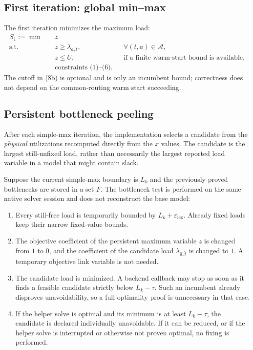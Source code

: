 \documentclass[11pt,a4paper]{article}
\newcommand{\Acal}{\mathcal{A}}
\begin{document}
\subsection{First iteration: global min--max}

The first iteration minimizes the maximum load:
\begin{align}
S_1:=\min\quad &z \\
\text{s.t.}\quad
&z\geq\lambda_{a,t}, &&\forall(t,a)\in\Acal, \tag{8a}\\
&z\leq U, &&\text{if a finite warm-start bound is available}, \tag{8b}\\
&\text{constraints (1)--(6).} \nonumber
\end{align}
The cutoff in (8b) is optional and is only an incumbent bound; correctness does
not depend on the common-routing warm start succeeding.

\subsection{Persistent bottleneck peeling}

After each simple-max iteration, the implementation selects a candidate from
the \emph{physical} utilizations recomputed directly from the $x$ values. The
candidate is the largest still-unfixed load, rather than necessarily the largest
reported load variable in a model that might contain slack.

Suppose the current simple-max boundary is $L_k$ and the previously proved
bottlenecks are stored in a set $F$. The bottleneck test is performed on the
same native solver session and does not reconstruct the base model:

\begin{enumerate}[nosep]
    \item Every still-free load is temporarily bounded by
    $L_k+\varepsilon_{\mathrm{lex}}$. Already fixed loads keep their narrow
    fixed-value bounds.
    \item The objective coefficient of the persistent maximum variable $z$ is
    changed from $1$ to $0$, and the coefficient of the candidate load
    $\lambda_{\hat a,\hat t}$ is changed to $1$. A temporary objective link
    variable is not needed.
    \item The candidate load is minimized. A backend callback may stop as soon
    as it finds a feasible candidate strictly below
    $L_k-\tau$. Such an incumbent already disproves unavoidability, so a full
    optimality proof is unnecessary in that case.
    \item If the helper solve is optimal and its minimum is at least
    $L_k-\tau$, the candidate is declared individually unavoidable. If it can
    be reduced, or if the helper solve is interrupted or otherwise not proven
    optimal, no fixing is performed.
\end{enumerate}
\end{document}
